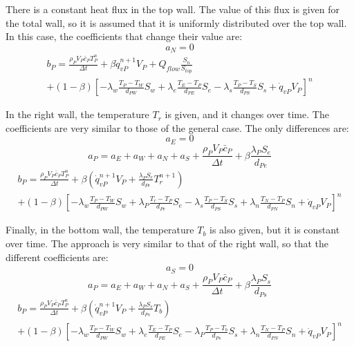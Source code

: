 There is a constant heat flux in the top wall. The value of this flux is given for the total wall, so it is assumed that it is uniformly distributed over the top wall. In this case, the coefficients that change their value are:
\begin{equation}
a_{N}=0
\end{equation}
\begin{multline}
b_{P}=\frac{\rho_{P}V_{P}\bar{c}_{P}T_{P}^{n}}{\Delta t}+\beta\dot{q}_{vP}^{n+1}V_{P}+Q_{flow}\frac{S_{n}}{S_{top}} \\
+\left(1-\beta\right)\left[-\lambda_{w}\frac{T_{P}-T_{W}}{d_{PW}}S_{w}+\lambda_{e}\frac{T_{E}-T_{P}}{d_{PE}}S_{e}-\lambda_{s}\frac{T_{P}-T_{S}}{d_{PS}}S_{s}+\dot{q}_{vP}V_{P}\right]^{n}
\end{multline}

In the right wall, the temperature $T_{r}$ is given, and it changes over time. The coefficients are very similar to those of the general case. The only differences are:
\begin{equation}
a_{E}=0
\end{equation}
\begin{equation}
a_P=a_{E}+a_{W}+a_{N}+a_{S}+\frac{\rho_{P}V_{P}\bar{c}_{P}}{\Delta t}+\beta\frac{\lambda_{P}S_{e}}{d_{Pe}}
\end{equation}
\begin{multline}
b_{P}=\frac{\rho_{P}V_{P}\bar{c}_{P}T_{P}^{n}}{\Delta t}+\beta\left(\dot{q}_{vP}^{n+1}V_{P}+\frac{\lambda_{P}S_{e}}{d_{Pe}}T_{r}^{n+1}\right) \\
+\left(1-\beta\right)\left[-\lambda_{w}\frac{T_{P}-T_{W}}{d_{PW}}S_{w}+\lambda_{P}\frac{T_{r}-T_{P}}{d_{Pe}}S_{e}-\lambda_{s}\frac{T_{P}-T_{S}}{d_{PS}}S_{s}+\lambda_{n}\frac{T_{N}-T_{P}}{d_{PN}}S_{n}+\dot{q}_{vP}V_{P}\right]^{n}
\end{multline}

Finally, in the bottom wall, the temperature $T_{b}$ is also given, but it is constant over time. The approach is very similar to that of the right wall, so that the different coefficients are:
\begin{equation}
a_{S}=0
\end{equation}
\begin{equation}
a_P=a_{E}+a_{W}+a_{N}+a_{S}+\frac{\rho_{P}V_{P}\bar{c}_{P}}{\Delta t}+\beta\frac{\lambda_{P}S_{s}}{d_{Ps}}
\end{equation}
\begin{multline}
b_{P}=\frac{\rho_{P}V_{P}\bar{c}_{P}T_{P}^{n}}{\Delta t}+\beta\left(\dot{q}_{vP}^{n+1}V_{P}+\frac{\lambda_{P}S_{s}}{d_{Ps}}T_{b}\right) \\
+\left(1-\beta\right)\left[-\lambda_{w}\frac{T_{P}-T_{W}}{d_{PW}}S_{w}+\lambda_{e}\frac{T_{E}-T_{P}}{d_{PE}}S_{e}-\lambda_{P}\frac{T_{P}-T_{b}}{d_{Ps}}S_{s}+\lambda_{n}\frac{T_{N}-T_{P}}{d_{PN}}S_{n}+\dot{q}_{vP}V_{P}\right]^{n}
\end{multline}

